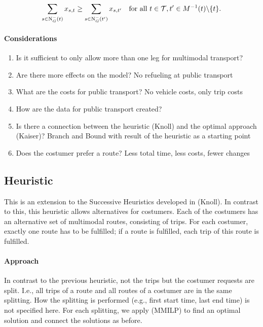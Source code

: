 \begin{align}
	\sum_{s\in\operatorname{N}_G^-(t)} x_{s,t} \geq \sum_{s\in\operatorname{N}_G^-(t')} x_{s,t'} & & \text{for all } t\in\mathcal{T}, t'\in M^{-1}(t)\backslash\{t\}.
\end{align}

\paragraph{Considerations}

\begin{enumerate}
	\item{Is it sufficient to only allow more than one leg for multimodal transport?}
	\item{Are there more effects on the model? No refueling at public transport}
	\item{What are the costs for public transport? No vehicle costs, only trip costs}
	\item{How are the data for public transport created?}
	\item{Is there a connection between the heuristic (Knoll) and the optimal approach (Kaiser)? Branch and Bound with result of the heuristic as a starting point}
	\item{Does the costumer prefer a route? Less total time, less costs, fewer changes}
\end{enumerate}

\subsection{Heuristic}

This is an extension to the Successive Heuristics developed in (Knoll). In contrast to this, this heuristic allows alternatives for costumers. Each of the costumers has an alternative set of multimodal routes, consisting of trips. For each costumer, exactly one route has to be fulfilled; if a route is fulfilled, each trip of this route is fulfilled.

\paragraph{Approach} \parfill

In contrast to the previous heuristic, not the trips but the costumer requests are split. I.e., all trips of a route and all routes of a costumer are in the same splitting. How the splitting is performed (e.g., first start time, last end time) is not specified here.
For each splitting, we apply (MMILP) to find an optimal solution and connect the solutions as before. \\

